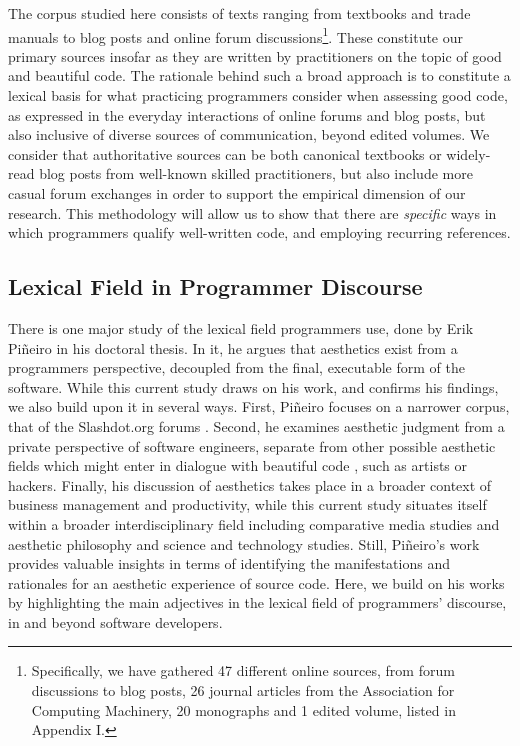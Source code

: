 The corpus studied here consists of texts ranging from textbooks and trade manuals to blog posts and online forum discussions\footnote{Specifically, we have gathered 47 different online sources, from forum discussions to blog posts, 26 journal articles from the Association for Computing Machinery, 20 monographs and 1 edited volume, listed in Appendix I.}. These constitute our primary sources insofar as they are written by practitioners on the topic of good and beautiful code. The rationale behind such a broad approach is to constitute a lexical basis for what practicing programmers consider when assessing good code, as expressed in the everyday interactions of online forums and blog posts, but also inclusive of diverse sources of communication, beyond edited volumes. We consider that authoritative sources can be both canonical textbooks or widely-read blog posts from well-known skilled practitioners, but also include more casual forum exchanges in order to support the empirical dimension of our research. This methodology will allow us to show that there are \emph{specific} ways in which programmers qualify well-written code, and employing recurring references.

\subsection{Lexical Field in Programmer Discourse}
\label{subsec:lexical-fields}

There is one major study of the lexical field programmers use, done by Erik Piñeiro in his doctoral thesis. In it, he argues that aesthetics exist from a programmers perspective, decoupled from the final, executable form of the software. While this current study draws on his work, and confirms his findings, we also build upon it in several ways. First, Piñeiro focuses on a narrower corpus, that of the Slashdot.org forums \citep{pineiro_aesthetics_2003}. Second, he examines aesthetic judgment from a private perspective of software engineers, separate from other possible aesthetic fields which might enter in dialogue with beautiful code \citep{pineiro_aesthetics_2003}, such as artists or hackers. Finally, his discussion of aesthetics takes place in a broader context of business management and productivity, while this current study situates itself within a broader interdisciplinary field including comparative media studies and aesthetic philosophy and science and technology studies. Still, Piñeiro's work provides valuable insights in terms of identifying the manifestations and rationales for an aesthetic experience of source code. Here, we build on his works by highlighting the main adjectives in the lexical field of programmers' discourse, in and beyond software developers.

